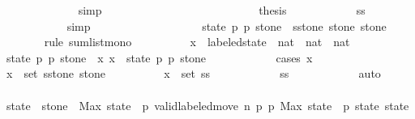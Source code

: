\begin{isabellebody}
\ \ \ \ \ \ \ \ \ \ \ \ \isamarkupfalse%
\ simp\isanewline
\ \ \ \ \ \ \ \ \isamarkupfalse%
\isanewline
\ \ \ \ \ \ \ \ \isamarkupfalse%
\isanewline
\ \ \ \ \ \ \ \ \isamarkupfalse%
\ {\isacharquery}thesis\isanewline
\ \ \ \ \ \ \ \ \ \ \isamarkupfalse%
\ ss\isanewline
\ \ \ \ \ \ \ \ \ \ \isamarkupfalse%
\ simp\isanewline
\ \ \ \ \ \ \isamarkupfalse%
\isanewline
\ \ \ \ \ \ \isamarkupfalse%
\ \isamarkupfalse%
\ {\isachardoublequoteopen}{\isachardot}{\isachardot}{\isachardot}\ {\isasymle}\ {\isacharparenleft}{\isasymSum}\ {\isacharparenleft}state{\isacharcomma}\ p{}{\isacharcomma}\ p{}{\isacharcomma}\ stone{\isacharparenright}\ {\isasymleftarrow}\ {\isacharquery}sstone\ stone{\isachardot}\ stone\ {\isacharplus}\ {}{\isacharparenright}{\isachardoublequoteclose}\isanewline
\ \ \ \ \ \ \isamarkupfalse%
\ {\isacharparenleft}rule\ sum{\isacharunderscore}list{\isacharunderscore}mono{\isacharparenright}\isanewline
\ \ \ \ \ \ \ \ \isamarkupfalse%
\ x\ {\isacharcolon}{\isacharcolon}\ {\isachardoublequoteopen}labeled{\isacharunderscore}state\ {\isasymtimes}\ nat\ {\isasymtimes}\ nat\ {\isasymtimes}\ nat{\isachardoublequoteclose}\isanewline
\ \ \ \ \ \ \ \ \isamarkupfalse%
\ state\ p{}\ p{}\ stone{\isacharprime}\ \ x{\isacharcolon}\ {\isachardoublequoteopen}x\ {\isacharequal}\ {\isacharparenleft}state{\isacharcomma}\ p{}{\isacharcomma}\ p{}{\isacharcomma}\ stone{\isacharprime}{\isacharparenright}{\isachardoublequoteclose}\isanewline
\ \ \ \ \ \ \ \ \ \ \isamarkupfalse%
\ {\isacharparenleft}cases\ x{\isacharparenright}\isanewline
\ \ \ \ \ \ \ \ \isamarkupfalse%
\ {\isachardoublequoteopen}x\ {\isasymin}\ set\ {\isacharparenleft}{\isacharquery}sstone\ stone{\isacharparenright}{\isachardoublequoteclose}\isanewline
\ \ \ \ \ \ \ \ \isamarkupfalse%
\ {\isachardoublequoteopen}x\ {\isasymin}\ set\ ss{\isachardoublequoteclose}\isanewline
\ \ \ \ \ \ \ \ \ \ \isamarkupfalse%
\ ss\isanewline
\ \ \ \ \ \ \ \ \ \ \isamarkupfalse%
\ auto\isanewline
\ \ \ \ \ \ \ \ \isamarkupfalse%
\ \isamarkupfalse%
\ state{\isacharprime}\ \ {\isachardoublequoteopen}stone{\isacharprime}\ {\isacharequal}\ Max\ {\isacharparenleft}state\ {\isacharbang}\ p{}{\isacharparenright}{\isachardoublequoteclose}\ {\isachardoublequoteopen}valid{\isacharunderscore}labeled{\isacharunderscore}move{\isacharprime}\ n\ p{}\ p{}\ {\isacharparenleft}Max\ {\isacharparenleft}state\ {\isacharbang}\ p{}{\isacharparenright}{\isacharparenright}\ state\ state{\isacharprime}{\isachardoublequoteclose}\isanewline

\end{isabellebody}
